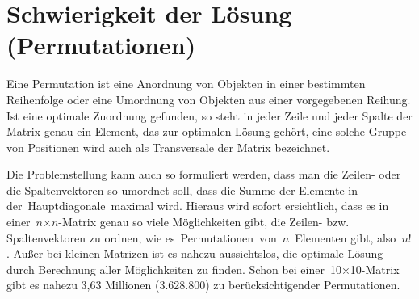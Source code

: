 %
%
%
\section{Schwierigkeit der Lösung (Permutationen)
\label{munkres:section:teil2}}

Eine Permutation ist eine Anordnung von Objekten in einer bestimmten Reihenfolge oder eine Umordnung von Objekten aus einer vorgegebenen Reihung. Ist eine optimale Zuordnung gefunden, so steht in jeder Zeile und jeder Spalte der Matrix genau ein Element, das zur optimalen Lösung gehört, eine solche Gruppe von Positionen wird auch als Transversale der Matrix bezeichnet. 

Die Problemstellung kann auch so formuliert werden, dass man die Zeilen- oder die Spaltenvektoren so umordnet soll, dass die Summe der Elemente in der Hauptdiagonale maximal wird. Hieraus wird sofort ersichtlich, dass es in einer $n$×$n$-Matrix genau so viele Möglichkeiten gibt, die Zeilen- bzw. Spaltenvektoren zu ordnen, wie es Permutationen von $n$ Elementen gibt, also $n!$. Außer bei kleinen Matrizen ist es nahezu aussichtslos, die optimale Lösung durch Berechnung aller Möglichkeiten zu finden. Schon bei einer 10×10-Matrix gibt es nahezu 3,63 Millionen (3.628.800) zu berücksichtigender Permutationen.


